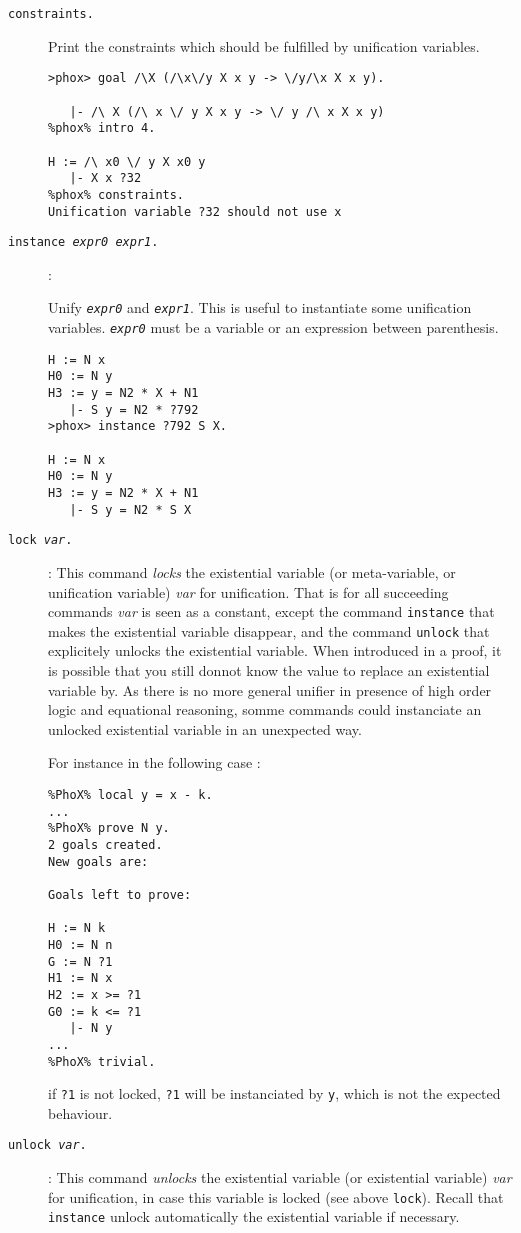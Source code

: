 \begin{description}
\item[{\tt constraints.}]

  Print the constraints which should be fulfilled by unification variables.

\begin{verbatim}
>phox> goal /\X (/\x\/y X x y -> \/y/\x X x y).

   |- /\ X (/\ x \/ y X x y -> \/ y /\ x X x y)
%phox% intro 4.

H := /\ x0 \/ y X x0 y
   |- X x ?32
%phox% constraints.
Unification variable ?32 should not use x
\end{verbatim}

\item[{\tt instance {\em expr0} {\em expr1}.}] :

  Unify {\tt\em expr0} and {\tt\em expr1}. This is useful to instantiate some
  unification variables. {\tt\em expr0} must be a variable or an expression
  between parenthesis.

\begin{verbatim}
H := N x
H0 := N y
H3 := y = N2 * X + N1
   |- S y = N2 * ?792
>phox> instance ?792 S X.

H := N x
H0 := N y
H3 := y = N2 * X + N1
   |- S y = N2 * S X
\end{verbatim}
  
\item[{\tt lock {\em var}.}] : This command {\em locks} the
  existential variable (or meta-variable, or unification variable) {\em
    var} for unification.  That is for all succeeding commands {\em var}
  is seen as a constant, except the command {\tt instance} that makes
  the existential variable disappear, and the command {\tt unlock} that
  explicitely unlocks the existential variable.  When introduced in a
  proof, it is possible that you still donnot know the value to replace
  an existential variable by. As there is no more general unifier in
  presence of high order logic and equational reasoning, somme commands
  could instanciate an unlocked existential variable in an unexpected
  way.

For instance in the following case :
\begin{verbatim}
%PhoX% local y = x - k.  
...
%PhoX% prove N y.  
2 goals created.
New goals are:

Goals left to prove:

H := N k
H0 := N n
G := N ?1
H1 := N x
H2 := x >= ?1
G0 := k <= ?1
   |- N y
...
%PhoX% trivial.

\end{verbatim}

if {\tt ?1} is not locked, {\tt ?1} will be instanciated by {\tt y},
which is not the expected behaviour.

\item[{\tt unlock {\em var}.}] : This command {\em unlocks} the
  existential variable (or existential variable) {\em var} for unification, in
  case this variable is locked (see above {\tt lock}). Recall that {\tt
    instance} unlock automatically the existential variable if
  necessary.

\end{description}
